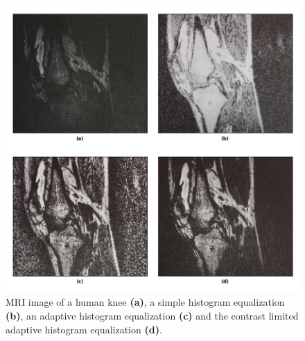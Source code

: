 \begin{figure}[htb]
	\caption{\label{fig:hr_ahe_clahe} MRI image of a human knee \textbf{(a)}, a simple histogram equalization \textbf{(b)}, an adaptive histogram equalization \textbf{(c)} and the contrast limited adaptive histogram equalization \textbf{(d)}.} 
	\begin{center}
	    \includegraphics[scale=0.4]{images/knee_HE_AHE_CLAHE.png}
	\end{center}
	\centering
\end{figure}
